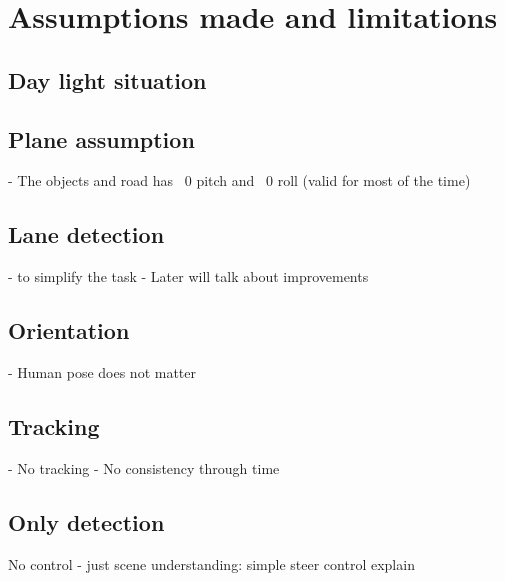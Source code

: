 \chapter{Assumptions made and limitations}
\label{chap:assumptions}

\section{Day light situation}

\section{Plane assumption}
-  The objects and road has ~0 pitch and ~0 roll (valid for most of the time)

\section{Lane detection}

- to simplify the task
- Later will talk about improvements

\section{Orientation}
- Human pose does not matter
\section{Tracking}
- No tracking
- No consistency through time
\section{Only detection}

No control - just scene understanding:
simple steer control explain